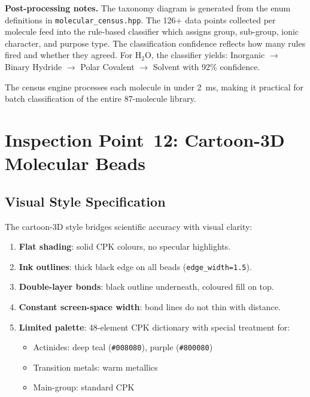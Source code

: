 \documentclass[11pt,a4paper]{article}
\begin{document}
\noindent\textbf{Post-processing notes.}  The taxonomy diagram is generated
from the enum definitions in \texttt{molecular\_census.hpp}.  The 126+
data points collected per molecule feed into the rule-based classifier
which assigns group, sub-group, ionic character, and purpose type.  The
classification confidence reflects how many rules fired and whether they
agreed.  For H$_2$O, the classifier yields: Inorganic $\to$ Binary
Hydride $\to$ Polar Covalent $\to$ Solvent with 92\% confidence.

The census engine processes each molecule in under 2~ms, making it
practical for batch classification of the entire 87-molecule library.

\section{Inspection Point~12: Cartoon-3D Molecular Beads}
\label{sec:beads}

\subsection{Visual Style Specification}

The cartoon-3D style bridges scientific accuracy with visual clarity:

\begin{enumerate}
  \item \textbf{Flat shading}: solid CPK colours, no specular highlights.
  \item \textbf{Ink outlines}: thick black edge on all beads
        (\texttt{edge\_width=1.5}).
  \item \textbf{Double-layer bonds}: black outline underneath, coloured fill
        on top.
  \item \textbf{Constant screen-space width}: bond lines do not thin with
        distance.
  \item \textbf{Limited palette}: 48-element CPK dictionary with special
        treatment for:
        \begin{itemize}
          \item Actinides: deep teal (\texttt{\#008080}), purple (\texttt{\#800080})
          \item Transition metals: warm metallics
          \item Main-group: standard CPK
        \end{itemize}
\end{enumerate}
\end{document}
